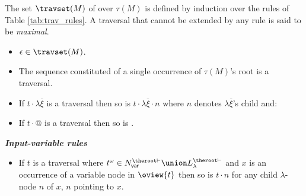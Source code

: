 \begin{definition} \rm
\label{def:traversal} The set $\travset(M)$ of 
over $\tau(M)$ is defined by induction over the rules of Table
\ref{tab:trav_rules}. A traversal that cannot be extended by any
rule is said to be \emph{maximal}.
\end{definition}
\begin{FramedTable}
\begin{itemize}[]
\item{} $\epsilon \in \travset(M)$.
\item{} The sequence constituted of a single occurrence of $\tau(M)$'s root is a traversal.
\end{itemize}

\begin{itemize}[]
    \item {} If $t \cdot \lambda \overline{\xi}$ is a traversal then so is
        $t \cdot \lambda \overline{\xi} \cdot n$ where $n$
        denotes $\lambda \overline{\xi}$'s child and:
    \item {} If $t \cdot @$ is a traversal then so is .
\end{itemize}

\emph{\bf Input-variable rules}
\begin{itemize}[]
\item {} If $t$ is a traversal where $t^\omega \in N_{\sf var}^{\theroot\vdash} \union L_\lambda^{\theroot\vdash}$
and $x$ is an occurrence of a variable node in $\oview{t}$ then
so is $t \cdot n$ for any child $\lambda$-node $n$ of $x$, $n$
pointing to $x$.




\end{itemize}
\end{FramedTable}
